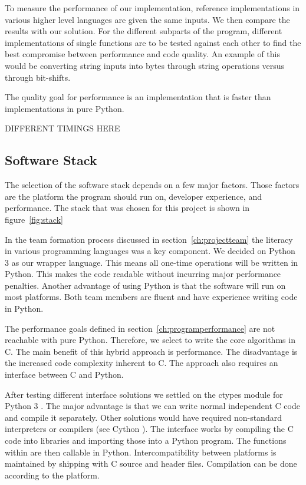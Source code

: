 To measure the performance of our implementation, reference implementations in various higher level languages are given the same inputs. We then compare the results with our solution. For the different subparts of the program, different implementations of single functions are to be tested against each other to find the best compromise between performance and code quality. An example of this would be converting string inputs into bytes through string operations versus through bit-shifts.

The quality goal for performance is an implementation that is faster than implementations in pure Python.

DIFFERENT TIMINGS HERE

\subsection{Software Stack}
\label{ch:softwarestack}
The selection of the software stack depends on a few major factors. Those factors are the platform the program should run on, developer experience, and performance. The stack that was chosen for this project is shown in figure~\ref{fig:stack}

In the team formation process discussed in section~\ref{ch:projectteam} the literacy in various programming languages was a key component. We decided on Python 3 as our wrapper language. This means all one-time operations will be written in Python. This makes the code readable without incurring major performance penalties. Another advantage of using Python is that the software will run on most platforms. Both team members are fluent and have experience writing code in Python.

The performance goals defined in section~\ref{ch:programperformance} are not reachable with pure Python. Therefore, we select to write the core algorithms in C. The main benefit of this hybrid approach is performance. The disadvantage is the increased code complexity inherent to C. The approach also requires an interface between C and Python.

After testing different interface solutions we settled on the ctypes module for Python 3 \cite{ctypes}. The major advantage is that we can write normal independent C code and compile it separately. Other solutions would have required non-standard interpreters or compilers (see Cython \cite{cython}). The interface works by compiling the C code into libraries and importing those into a Python program. The functions within are then callable in Python. Intercompatibility between platforms is maintained by shipping with C source and header files. Compilation can be done according to the platform.

